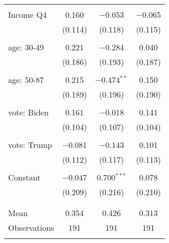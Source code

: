 \begin{tabular}{@{\extracolsep{5pt}}lccc}
  & & & \\ 
 Income Q4 & 0.160 & $-$0.053 & $-$0.065 \\ 
  & (0.114) & (0.118) & (0.115) \\ 
  & & & \\ 
 age: 30-49 & 0.221 & $-$0.284 & 0.040 \\ 
  & (0.186) & (0.193) & (0.187) \\ 
  & & & \\ 
 age: 50-87 & 0.215 & $-$0.474$^{**}$ & 0.150 \\ 
  & (0.189) & (0.196) & (0.190) \\ 
  & & & \\ 
 vote: Biden & 0.161 & $-$0.018 & 0.141 \\ 
  & (0.104) & (0.107) & (0.104) \\ 
  & & & \\ 
 vote: Trump & $-$0.081 & $-$0.143 & 0.101 \\ 
  & (0.112) & (0.117) & (0.113) \\ 
  & & & \\ 
 Constant & $-$0.047 & 0.700$^{***}$ & 0.078 \\ 
  & (0.209) & (0.216) & (0.210) \\ 
  & & & \\ 
\hline \\[-1.8ex] 
Mean & 0.354 & 0.426 & 0.313 \\ 
Observations & 191 & 191 & 191 \\ 
\hline 
\hline \\[-1.8ex] 
\end{tabular} 
